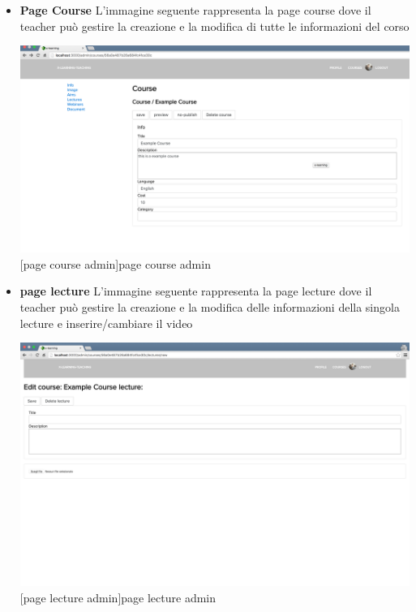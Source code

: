 \begin{itemize}
\item \textbf{Page Course} L'immagine seguente rappresenta la page course dove il teacher può gestire la creazione e la modifica di tutte le informazioni del corso\par

\begin{minipage}{\linewidth}
    \centering
    \includegraphics[width=1.0\linewidth]{images/chapter4/page-course-admin.png}
    [page course admin]{page course admin}
\end{minipage}

\item \textbf{page lecture} L'immagine seguente rappresenta la page lecture dove il teacher può gestire la creazione e la modifica delle informazioni della singola lecture e inserire/cambiare il video\par

\begin{minipage}{\linewidth}
    \centering
    \includegraphics[width=1.0\linewidth]{images/chapter4/page-lecture-admin.png}
    [page lecture admin]{page lecture admin}
\end{minipage}


\end{itemize}
